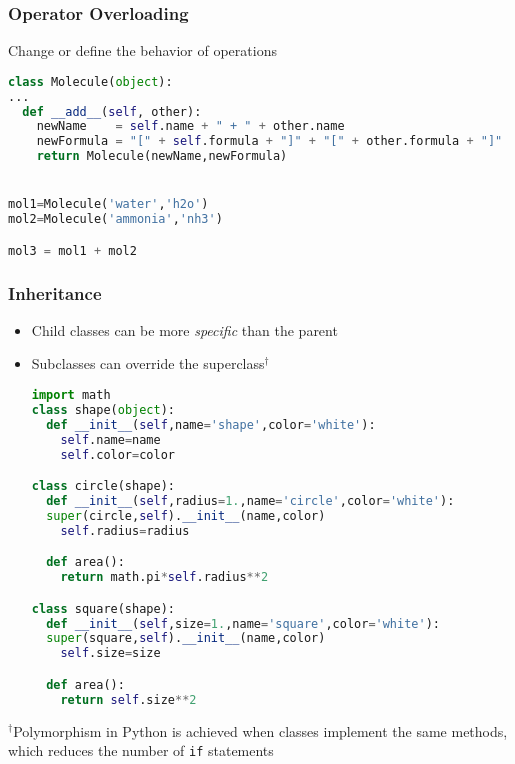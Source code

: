 \documentclass[xcolor=table,10pt,final]{beamer}
\begin{document}
\begin{frame}[fragile]
  \frametitle{Operator Overloading}
  Change or define the behavior of operations
  \begin{lstlisting}[language=Python]
class Molecule(object):
...
  def __add__(self, other):
    newName    = self.name + " + " + other.name
    newFormula = "[" + self.formula + "]" + "[" + other.formula + "]"
    return Molecule(newName,newFormula)


mol1=Molecule('water','h2o')
mol2=Molecule('ammonia','nh3')

mol3 = mol1 + mol2
  \end{lstlisting}
\end{frame}

\begin{frame}[fragile]
  \frametitle{Inheritance}
  \begin{itemize}
    \item Child classes can be more {\it specific} than the parent\\
    \item Subclasses can override the superclass$^\dagger$\\
\begin{lstlisting}[language=Python]
import math
class shape(object):
  def __init__(self,name='shape',color='white'):
    self.name=name
    self.color=color

class circle(shape):
  def __init__(self,radius=1.,name='circle',color='white'):
  super(circle,self).__init__(name,color)
    self.radius=radius

  def area():
    return math.pi*self.radius**2

class square(shape):
  def __init__(self,size=1.,name='square',color='white'):
  super(square,self).__init__(name,color)
    self.size=size

  def area():
    return self.size**2
\end{lstlisting}
  \end{itemize}
  $^\dagger${\scriptsize Polymorphism in Python is achieved when classes implement the same methods, which reduces the number of {\tt if} statements}
\end{frame}
\end{document}
